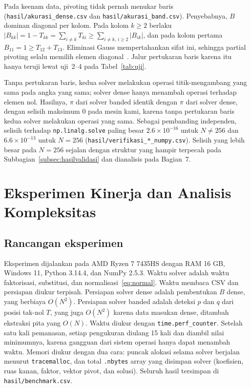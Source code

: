 \documentclass[12pt,a4paper]{article}
\numberwithin{equation}{section}
\begin{document}
Pada keenam data, pivoting tidak pernah menukar baris (\texttt{hasil/akurasi\_dense.csv} dan
\texttt{hasil/akurasi\_band.csv}). Penyebabnya, $B$ dominan diagonal per kolom. Pada kolom $k\ge2$ berlaku
$\lvert B_{kk}\rvert=1-T_{kk}=\sum_{i\ne k}T_{ki}\ge\sum_{i\ne k,\,i\ge2}\lvert B_{ik}\rvert$, dan pada kolom pertama
$B_{11}=1\ge T_{12}+T_{13}$. Eliminasi Gauss mempertahankan sifat ini, sehingga partial pivoting selalu memilih elemen
diagonal~\cite{golub}. Jalur pertukaran baris karena itu hanya teruji lewat uji~2--4 pada Tabel~\ref{tab:uji}.

Tanpa pertukaran baris, kedua solver melakukan operasi titik-mengambang yang sama pada angka yang sama; solver dense
hanya menambah operasi terhadap elemen nol. Hasilnya, $\pi$ dari solver banded identik dengan $\pi$ dari solver dense,
dengan selisih maksimum $0$ pada mesin kami, karena tanpa pertukaran baris kedua solver melakukan operasi yang sama. Sebagai pembanding independen, selisih terhadap
\texttt{np.linalg.solve} paling besar $2.6\times10^{-16}$ untuk $N\ne256$ dan $6.6\times10^{-13}$ untuk $N=256$
(\texttt{hasil/verifikasi\_*\_numpy.csv}). Selisih yang lebih besar pada $N=256$ sejalan dengan struktur yang hampir
terpecah pada Subbagian~\ref{subsec:hasilvalidasi} dan dianalisis pada Bagian~7.

\section{Eksperimen Kinerja dan Analisis Kompleksitas}\label{sec:eksperimen}

\subsection{Rancangan eksperimen}
Eksperimen dijalankan pada AMD Ryzen 7 7435HS dengan RAM 16 GB, Windows 11, Python 3.14.4, dan NumPy 2.5.3.
Waktu solver adalah waktu faktorisasi, substitusi, dan normalisasi~\eqref{eq:normal}. Waktu membaca CSV dan
persiapan diukur terpisah. Persiapan solver dense adalah pembentukan $B$ dense, yang berbiaya $O(N^2)$. Persiapan
solver banded adalah deteksi $p$ dan $q$ dari posisi tak-nol $T$, yang juga $O(N^2)$ karena data masukan dense,
ditambah ekstraksi pita yang $O(N)$. Waktu diukur dengan \texttt{time.perf\_counter}. Setelah satu kali pemanasan,
setiap pengukuran diulang 15 kali dan diambil nilai minimumnya, karena gangguan dari sistem operasi hanya dapat
menambah waktu. Memori diukur dengan dua cara: puncak alokasi selama solver berjalan menurut \texttt{tracemalloc},
dan total \texttt{.nbytes} array yang disimpan solver (koefisien, ruas kanan, faktor, vektor pivot, dan solusi).
Seluruh hasil tersimpan di \texttt{hasil/benchmark.csv}.
\end{document}
